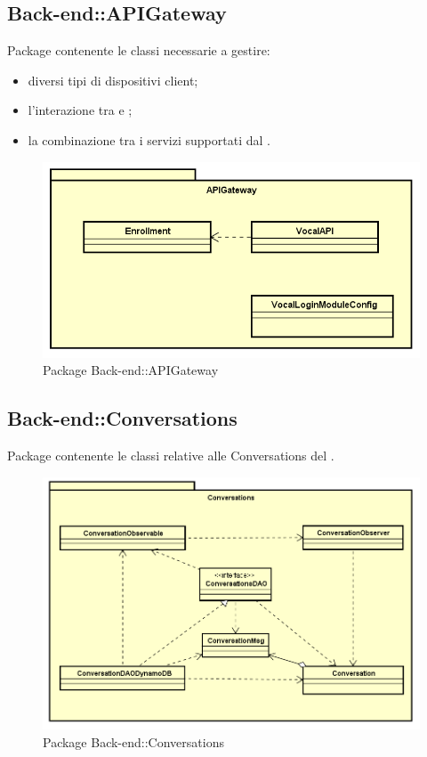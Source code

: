 \subsection{Back-end::APIGateway}
Package contenente le classi necessarie a gestire: \begin{itemize} \item diversi tipi di dispositivi client; \item l'interazione tra  e ; \item la combinazione tra i servizi supportati dal . \end{itemize}
\begin{figure}[h] \centering \includegraphics[width=\textwidth,height=\textheight,keepaspectratio]{images/diagrams/back-end/Official_Backend_0304/APIGateway.png}
\caption{Package Back-end::APIGateway}
\end{figure}
\newpage



\subsection{Back-end::Conversations}
Package contenente le classi relative alle Conversations del .
\begin{figure}[h] \centering \includegraphics[width=\textwidth,height=\textheight,keepaspectratio]{images/diagrams/back-end/Official_Backend_0304/Conversations.png}
\caption{Package Back-end::Conversations}
\end{figure}
\newpage

